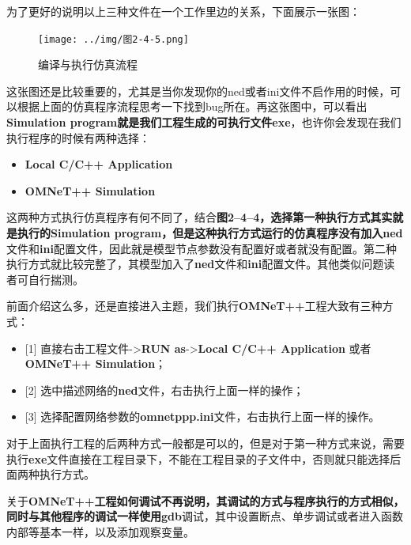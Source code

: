 为了更好的说明以上三种文件在一个工作里边的关系，下面展示一张图：

\begin{figure}[htbp]
\centering
\texttt{[image: ../img/图2-4-5.png]}
\caption{编译与执行仿真流程}
\end{figure}

这张图还是比较重要的，尤其是当你发现你的ned或者ini文件不启作用的时候，可以根据上面的仿真程序流程思考一下找到bug所在。再这张图中，可以看出\textbf{Simulation program\textbf{就是我们工程生成的可执行文件}exe}，也许你会发现在我们执行程序的时候有两种选择：

\begin{itemize}
\item \textbf{Local C\slash C++ Application}

\item \textbf{OMNeT++ Simulation}

\end{itemize}

这两种方式执行仿真程序有何不同了，结合\textbf{图2--4--4\textbf{，选择第一种执行方式其实就是执行的}Simulation program\textbf{，但是这种执行方式运行的仿真程序没有加入}ned}文件和\textbf{ini}配置文件，因此就是模型节点参数没有配置好或者就没有配置。第二种执行方式就比较完整了，其模型加入了\textbf{ned}文件和\textbf{ini}配置文件。其他类似问题读者可自行揣测。

前面介绍这么多，还是直接进入主题，我们执行\textbf{OMNeT++}工程大致有三种方式：

\begin{itemize}
\item {[1]} 直接右击工程文件->\textbf{RUN as}->\textbf{Local C\slash C++ Application} 或者\textbf{OMNeT++ Simulation}；

\item {[2]} 选中描述网络的\textbf{ned}文件，右击执行上面一样的操作；

\item {[3]} 选择配置网络参数的\textbf{omnetppp.ini}文件，右击执行上面一样的操作。

\end{itemize}

对于上面执行工程的后两种方式一般都是可以的，但是对于第一种方式来说，需要执行\textbf{exe}文件直接在工程目录下，不能在工程目录的子文件中，否则就只能选择后面两种执行方式。

关于\textbf{OMNeT++\textbf{工程如何调试不再说明，其调试的方式与程序执行的方式相似，同时与其他程序的调试一样使用}gdb}调试，其中设置断点、单步调试或者进入函数内部等基本一样，以及添加观察变量。

